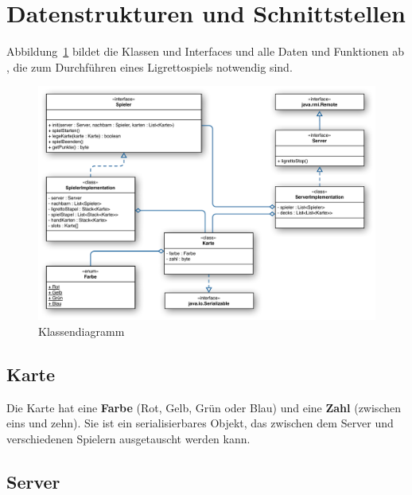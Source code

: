 \section{Datenstrukturen und Schnittstellen} 

Abbildung~\ref{Klassendiagramm} bildet die Klassen und Interfaces und alle Daten und Funktionen ab , die zum Durchführen eines Ligrettospiels notwendig sind.



\begin{figure}[H]
	\includegraphics[width=1.0\textwidth,angle=0]{graphics/klassendiagramm.pdf}
	\caption{Klassendiagramm \hfill{} }
	\label{Klassendiagramm}
\end{figure}


\subsection{Karte}

Die Karte hat eine {\bf Farbe} (Rot, Gelb, Grün oder Blau) und eine {\bf Zahl} (zwischen eins und zehn). Sie ist ein serialisierbares Objekt, das zwischen dem Server und verschiedenen Spielern ausgetauscht werden kann.




\subsection{Server}

